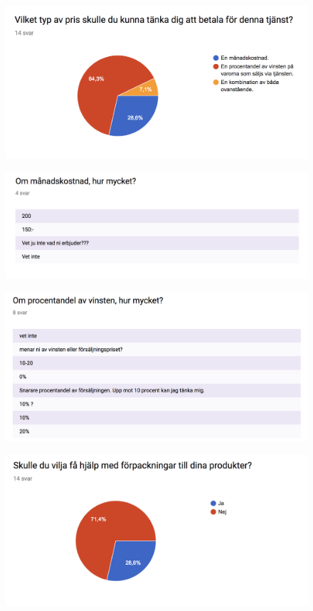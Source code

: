 \documentclass[10pt,a4paper,oneside]{article}
\begin{document}
\begin{figure}[H]
	\includegraphics[scale=0.6]{11.png}
\end{figure}

\begin{figure}[H]
	\includegraphics[scale=0.6]{12.png}
\end{figure}

\begin{figure}[H]
	\includegraphics[scale=0.6]{13.png}
\end{figure}

\begin{figure}[H]
	\includegraphics[scale=0.6]{14.png}
\end{figure}
\end{document}
